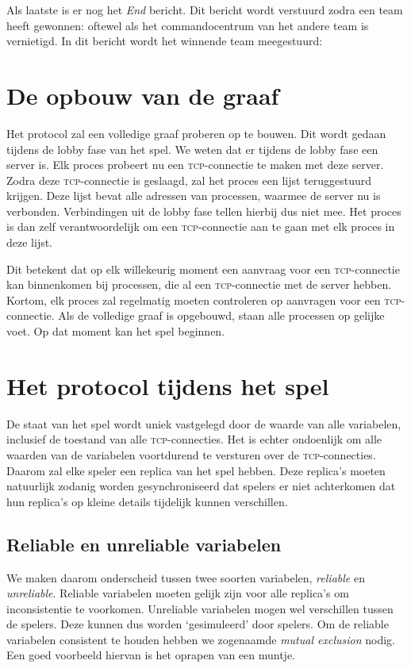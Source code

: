 \documentclass[a4paper,11pt, twoside]{article}
\newcommand{\bericht}[1]{
{\begin{center}

\colorbox{YellowGreen!20}{\makebox[\textwidth][c]{{
\textsc{#1}
}}}
\end{center}
}}
\newcommand{\tcp}{\textsc{tcp}\xspace}
\begin{document}
Als laatste is er nog het \emph{End} bericht. Dit bericht wordt verstuurd zodra een team heeft gewonnen: oftewel als het commandocentrum van het andere team is vernietigd. In dit bericht wordt het winnende team meegestuurd:
\bericht{R END, tid.}

    \section{De opbouw van de graaf}
    Het protocol zal een volledige graaf proberen op te bouwen. Dit wordt gedaan tijdens de lobby fase van het spel. We weten dat er tijdens de lobby fase een server is. Elk proces probeert nu een \tcp-connectie te maken met deze server. Zodra deze \tcp-connectie is geslaagd, zal het proces een lijst teruggestuurd krijgen. Deze lijst bevat alle adressen van processen, waarmee de server nu is verbonden. Verbindingen uit de lobby fase tellen hierbij dus niet mee. Het proces is dan zelf verantwoordelijk om een \tcp-connectie aan te gaan met elk proces in deze lijst.

    Dit betekent dat op elk willekeurig moment een aanvraag voor een \tcp-connectie kan binnenkomen bij processen, die al een \tcp-connectie met de server hebben. Kortom, elk proces zal regelmatig moeten controleren op aanvragen voor een \tcp-connectie. Als de volledige graaf is opgebouwd, staan alle processen op gelijke voet. Op dat moment kan het spel beginnen.

    \section{Het protocol tijdens het spel}
    \label{sec:tijdensspel}
    De staat van het spel wordt uniek vastgelegd door de waarde van alle variabelen, inclusief de toestand van alle \tcp-connecties. Het is echter ondoenlijk om alle waarden van de variabelen voortdurend te versturen over de \tcp-connecties. Daarom zal elke speler een replica van het spel hebben. Deze replica's moeten natuurlijk zodanig worden gesynchroniseerd dat spelers er niet achterkomen dat hun replica's op kleine details tijdelijk kunnen verschillen.

    \subsection{Reliable en unreliable variabelen}
    We maken daarom onderscheid tussen twee soorten variabelen, \emph{reliable} en \emph{unreliable}. Reliable variabelen moeten gelijk zijn voor alle replica's om inconsistentie te voorkomen. Unreliable variabelen mogen wel verschillen tussen de spelers. Deze kunnen dus worden `gesimuleerd' door spelers. Om de reliable variabelen consistent te houden hebben we zogenaamde \emph{mutual exclusion} nodig. Een goed voorbeeld hiervan is het oprapen van een muntje.
\end{document}
